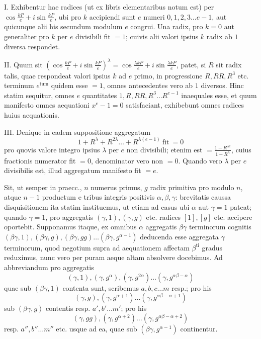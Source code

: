 I. Exhibentur hae radices (ut ex libris elementaribus notum est) per \(\cos\frac{kP}e+i\sin\frac{kP}e\), ubi pro \(k\) accipiendi sunt \(e\) numeri \(0,\allowbreak 1,\allowbreak 2,\allowbreak 3\ldots e-1\), aut quicunque alii his secundum modulum \(e\) congrui. Una radix, pro \(k=0\) aut generaliter pro \(k\) per \(e\) divisibili fit \(=1\); cuivis alii valori ipsius \(k\) radix ab \(1\) diversa respondet.

II. Quum sit \((\cos\frac{kP}e+i\sin\frac{kP}e)^\lambda=\cos\frac{\lambda kP}e+i\sin\frac{\lambda kP}e\), patet, si \(R\) sit radix talis, quae respondeat valori ipsius \(k\) ad \(e\) primo, in progressione \(R,\allowbreak RR,\allowbreak R^3\) etc. terminum \(e^{\mathrm{tum}}\) quidem esse \(=1\), omnes antecedentes vero ab \(1\) diversos. Hinc statim sequitur, omnes \(e\) quantitates \(1,\allowbreak R,\allowbreak RR,\allowbreak R^3\ldots R^{e-1}\) inaequales esse, et quum manifesto omnes aequationi \(x^e-1=0\) satisfaciant, exhibebunt omnes radices huius aequationis.

III. Denique in eadem suppositione aggregatum \[1+R^\lambda+R^{2\lambda}\ldots+R^{\lambda(e-1)}\ \text{fit}\ =0\] pro quovis valore integro ipsius \(\lambda\) per \(e\) non divisibili; etenim est \(=\frac{1-R^{\lambda e}}{1-R^\lambda}\), cuius fractionis numerator fit \(=0\), denominator vero non \(=0\). Quando vero \(\lambda\) per \(e\) divisibilis est, illud aggregatum manifesto fit \(=e\).

Sit, ut semper in praecc., \(n\) numerus primus, \(g\) radix primitiva pro modulo \(n\), atque \(n-1\) productum e tribus integris positivis \(\alpha,\allowbreak \beta,\allowbreak \gamma\): brevitatis caussa disquisitionem ita statim instituemus, ut etiam ad casus ubi \(\alpha\) aut \(\gamma=1\) pateat; quando \(\gamma=1\), pro aggregatis \((\gamma,1),\allowbreak (\gamma,g)\) etc. radices \([1],\allowbreak [g]\) etc. accipere oportebit. Supponamus itaque, ex omnibus \(\alpha\) aggregatis \(\beta\gamma\) terminorum cognitis \((\beta\gamma,1),\allowbreak (\beta\gamma,g),\allowbreak (\beta\gamma,gg)\ldots(\beta\gamma,g^{\alpha-1})\) deducenda esse aggregata \(\gamma\) terminorum, quod negotium supra ad aequationem affectam \(\beta^{\mathrm{ti}}\) gradus reduximus, nunc vero per puram aeque altam absolvere docebimus. Ad abbreviandum pro aggregatis \[(\gamma,1),(\gamma,g^\alpha),(\gamma,g^{2\alpha})\ldots(\gamma,g^{\alpha\beta-\alpha})\]
quae sub \((\beta\gamma,1)\) contenta sunt, scribemus \(a,\allowbreak b,\allowbreak c\ldots m\) resp.; pro his \[(\gamma,g),(\gamma,g^{\alpha+1})\ldots(\gamma,g^{\alpha\beta-\alpha+1})\] sub \((\beta\gamma,g)\) contentis resp. \(a',\allowbreak b'\ldots m'\); pro his \[(\gamma,gg),(\gamma,g^{\alpha+2})\ldots(\gamma,g^{\alpha\beta-\alpha+2})\] resp. \(a'',\allowbreak b''\ldots m''\) etc. usque ad ea, quae sub \((\beta\gamma,g^{\alpha-1})\) continentur.

